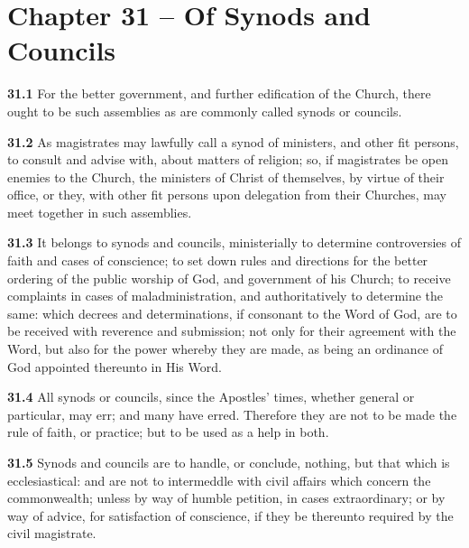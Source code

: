 \section{Chapter 31 -- Of Synods and Councils}

\par\textbf{31.1} For the better government, and further edification of the Church, there ought to be such assemblies as are commonly called synods or councils.   

\par\textbf{31.2} As magistrates may lawfully call a synod of ministers, and other fit persons, to consult and advise with, about matters of religion; so, if magistrates be open enemies to the Church, the ministers of Christ of themselves, by virtue of their office, or they, with other fit persons upon delegation from their Churches, may meet together in such assemblies.

\par\textbf{31.3} It belongs to synods and councils, ministerially to determine controversies of faith and cases of conscience; to set down rules and directions for the better ordering of the public worship of God, and government of his Church; to receive complaints in cases of maladministration, and authoritatively to determine the same: which decrees and determinations, if consonant to the Word of God, are to be received with reverence and submission; not only for their agreement with the Word, but also for the power whereby they are made, as being an ordinance of God appointed thereunto in His Word.   

\par\textbf{31.4} All synods or councils, since the Apostles{}' times, whether general or particular, may err; and many have erred. Therefore they are not to be made the rule of faith, or practice; but to be used as a help in both.   

\par\textbf{31.5} Synods and councils are to handle, or conclude, nothing, but that which is ecclesiastical: and are not to intermeddle with civil affairs which concern the commonwealth; unless by way of humble petition, in cases extraordinary; or by way of advice, for satisfaction of conscience, if they be thereunto required by the civil magistrate.  

